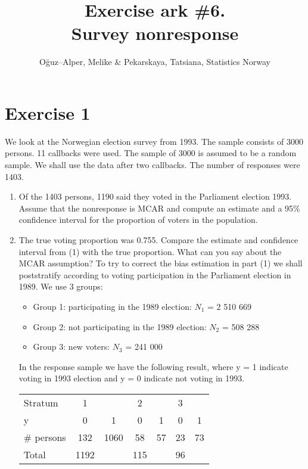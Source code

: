 \documentclass[12pt]{article}
\begin{document}
\title{Exercise ark \#6.\\ Survey nonresponse}
\author{O\u{g}uz--Alper, Melike \& Pekarskaya, Tatsiana, Statistics Norway}
\maketitle

\section*{Exercise 1}
We look at the Norwegian election survey from 1993. The sample consists of 3000 persons. 11 callbacks were used. The sample of 3000 is assumed to be a random sample.  We shall use the data after two callbacks. The number of responses were 1403.
\begin{enumerate}
\item Of the 1403 persons, 1190 said they voted in the Parliament election 1993. Assume that the nonresponse is MCAR and compute an estimate and a 95\% confidence interval for the proportion of voters in the population. 
\item The true voting proportion was 0.755. Compare the estimate and confidence interval from (1) with the true proportion. What can you say about the MCAR assumption?
To try to correct the bias estimation in part (1) we shall poststratify according to voting participation in the Parliament election in 1989. We use 3 groups: 
\begin{itemize}
\item Group 1: participating in the 1989 election: $N_1$ = 2 510 669
\item Group 2:  not participating in the 1989 election: $N_2$ = 508 288
\item Group 3: new voters: $N_3$ = 241 000
\end{itemize}
In the response sample we have the following result, where y = 1 indicate voting in 1993 election and y = 0 indicate not voting in 1993.
\begin{center}
\begin{tabular}{l|cc|cc|cc}
Stratum & 1 & & 2 & & 3 &\\ 
\hdashline
y & 0 & 1 & 0 & 1 & 0 & 1 \\
\hline
\hline
\# persons & 132 & 1060 & 58 & 57 & 23 & 73\\
\hdashline
Total & 1192 & & 115 & & 96 & \\
\end{tabular}
\end{center}

\end{enumerate}
\end{document}
